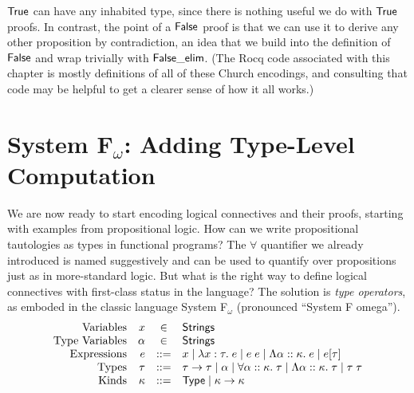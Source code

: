 \documentclass{amsbook}
\theoremstyle{definition}
\theoremstyle{remark}
\numberwithin{section}{chapter}
\numberwithin{equation}{chapter}
\begin{document}
$\mathsf{True}$ can have any inhabited type, since there is nothing useful we do with $\mathsf{True}$ proofs.
In contrast, the point of a $\mathsf{False}$ proof is that we can use it to derive any other proposition by contradiction, an idea that we build into the definition of $\mathsf{False}$ and wrap trivially with $\mathsf{False\_elim}$.
(The Rocq code associated with this chapter is mostly definitions of all of these Church encodings, and consulting that code may be helpful to get a clearer sense of how it all works.)


\section{System F$_\omega$: Adding Type-Level Computation}

\newcommand{\ty}[0]{\lc{Type}}

We are now ready to start encoding logical connectives and their proofs, starting with examples from propositional logic.
How can we write propositional tautologies as types in functional programs?
The $\forall$ quantifier we already introduced is named suggestively and can be used to quantify over propositions just as in more-standard logic.
But what is the right way to define logical connectives with first-class status in the language?
The solution is \emph{type operators}, as emboded in the classic language System F$_\omega$ (pronounced ``System F omega'').
$$\begin{array}{rrcl}
  \textrm{Variables} & x &\in& \mathsf{Strings} \\
  \textrm{Type Variables} & \alpha &\in& \mathsf{Strings} \\  
  \textrm{Expressions} & e &::=& x \mid \lambda x : \tau. \; e \mid e \; e \mid \Lambda \alpha :: \kappa. \; e \mid e[\tau] \\
  \textrm{Types} & \tau &::=& \tau \to \tau \mid \alpha \mid \forall \alpha :: \kappa. \; \tau \mid \Lambda \alpha :: \kappa. \; \tau \mid \tau \; \tau \\
  \textrm{Kinds} & \kappa &::=& \ty \mid \kappa \to \kappa
\end{array}$$

\newcommand{\haskind}[3]{#1 \vdash #2 :: #3}
\end{document}
